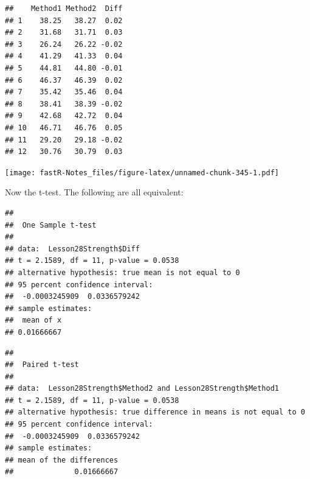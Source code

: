 \documentclass[]{book}
\newenvironment{Shaded}{\begin{snugshade}}{\end{snugshade}}
\newcommand{\KeywordTok}[1]{\textcolor[rgb]{0.13,0.29,0.53}{\textbf{#1}}}
\newcommand{\DataTypeTok}[1]{\textcolor[rgb]{0.13,0.29,0.53}{#1}}
\newcommand{\DecValTok}[1]{\textcolor[rgb]{0.00,0.00,0.81}{#1}}
\newcommand{\OperatorTok}[1]{\textcolor[rgb]{0.81,0.36,0.00}{\textbf{#1}}}
\newcommand{\NormalTok}[1]{#1}
\theoremstyle{definition}
\theoremstyle{definition}
\theoremstyle{definition}
\theoremstyle{remark}
\begin{document}
\begin{verbatim}
##    Method1 Method2  Diff
## 1    38.25   38.27  0.02
## 2    31.68   31.71  0.03
## 3    26.24   26.22 -0.02
## 4    41.29   41.33  0.04
## 5    44.81   44.80 -0.01
## 6    46.37   46.39  0.02
## 7    35.42   35.46  0.04
## 8    38.41   38.39 -0.02
## 9    42.68   42.72  0.04
## 10   46.71   46.76  0.05
## 11   29.20   29.18 -0.02
## 12   30.76   30.79  0.03
\end{verbatim}

\begin{Shaded}
\end{Shaded}

\texttt{[image: fastR-Notes\_files/figure-latex/unnamed-chunk-345-1.pdf]}

Now the t-test. The following are all equivalent:

\begin{Shaded}
\end{Shaded}

\begin{verbatim}
## 
##  One Sample t-test
## 
## data:  Lesson28Strength$Diff
## t = 2.1589, df = 11, p-value = 0.0538
## alternative hypothesis: true mean is not equal to 0
## 95 percent confidence interval:
##  -0.0003245909  0.0336579242
## sample estimates:
##  mean of x 
## 0.01666667
\end{verbatim}

\begin{Shaded}
\end{Shaded}

\begin{verbatim}
## 
##  Paired t-test
## 
## data:  Lesson28Strength$Method2 and Lesson28Strength$Method1
## t = 2.1589, df = 11, p-value = 0.0538
## alternative hypothesis: true difference in means is not equal to 0
## 95 percent confidence interval:
##  -0.0003245909  0.0336579242
## sample estimates:
## mean of the differences 
##              0.01666667
\end{verbatim}
\end{document}
